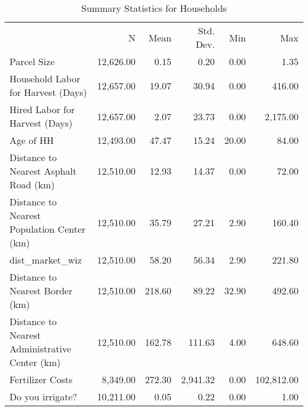 \begin{table}
\caption{Summary Statistics for Households}
\label{tbl:summary}
\begin{tabular}{lrrrrr}
{} & {N} & {Mean} & {Std. Dev.} & {Min} & {Max} \\
Parcel Size & 12,626.00 & 0.15 & 0.20 & 0.00 & 1.35 \\
Household Labor for Harvest (Days) & 12,657.00 & 19.07 & 30.94 & 0.00 & 416.00 \\
Hired Labor for Harvest (Days) & 12,657.00 & 2.07 & 23.73 & 0.00 & 2,175.00 \\
Age of HH & 12,493.00 & 47.47 & 15.24 & 20.00 & 84.00 \\
Distance to Nearest Asphalt Road (km) & 12,510.00 & 12.93 & 14.37 & 0.00 & 72.00 \\
Distance to Nearest Population Center (km) & 12,510.00 & 35.79 & 27.21 & 2.90 & 160.40 \\
dist_market_wiz & 12,510.00 & 58.20 & 56.34 & 2.90 & 221.80 \\
Distance to Nearest Border (km) & 12,510.00 & 218.60 & 89.22 & 32.90 & 492.60 \\
Distance to Nearest Administrative Center (km) & 12,510.00 & 162.78 & 111.63 & 4.00 & 648.60 \\
Fertilizer Costs & 8,349.00 & 272.30 & 2,941.32 & 0.00 & 102,812.00 \\
Do you irrigate? & 10,211.00 & 0.05 & 0.22 & 0.00 & 1.00 \\
\end{tabular}
\end{table}

